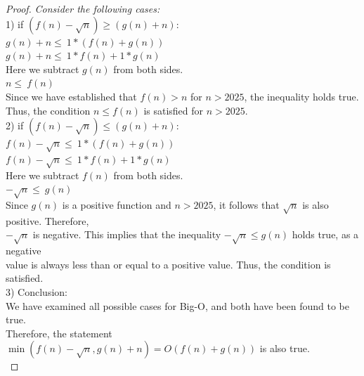 \documentclass[dvipsnames]{article}
\begin{document}
\begin{enumerate}
\begin{proof}
    \emph{Consider the following cases:}\\
    \hspace*{3mm}
    1) if $(f(n) - \sqrt{n}) \geq (g(n) + n)$:\\
    \hspace*{10mm}
    $g(n) + n \leq\ 1 * (f(n) + g(n))$\\
    \hspace*{10mm}
    $g(n) + n \leq\ 1 * f(n) + 1 * g(n)$\\
    \hspace*{8mm}
    Here we subtract $g(n)$ from both sides.\\
    \hspace*{10mm}
    $n \leq\ f(n)$\\
    \hspace*{8mm}
    Since we have established that $ f(n) > n $ for $ n > 2025 $, the inequality holds true.\\ 
    \hspace*{8mm}
    Thus, the condition $ n \leq f(n) $ is satisfied for $ n > 2025 $.\\

    
    \hspace*{3mm}
    2) if $(f(n) - \sqrt{n}) \leq (g(n) + n)$:\\
    \hspace*{10mm}
    $f(n) - \sqrt{n} \leq\ 1 * (f(n) + g(n))$\\
    \hspace*{10mm}
    $f(n) - \sqrt{n} \leq\ 1 * f(n) + 1 * g(n)$\\
    \hspace*{8mm}
    Here we subtract $f(n)$ from both sides.\\
    \hspace*{10mm}
    $- \sqrt{n} \leq\ g(n)$\\
    \hspace*{8mm}
    Since $ g(n) $ is a positive function and $ n > 2025 $, it follows that $ \sqrt{n} $ is also positive. Therefore, \\
    \hspace*{8mm}
    $ -\sqrt{n} $ is negative. This implies that the inequality $ -\sqrt{n} \leq g(n) $ holds true, as a negative\\
    \hspace*{8mm}
    value is always less than or equal to a positive value. Thus, the condition is satisfied.\\

    
    \hspace*{3mm}    
    3) Conclusion:\\
    \hspace*{8mm}
    We have examined all possible cases for Big-O, and both have been found to be true.\\
    \hspace*{8mm}
    Therefore, the statement $ \min(f(n) - \sqrt{n}, g(n) + n) = O(f(n) + g(n)) $ is also true.\\


\end{proof}
\end{enumerate}
\end{document}
